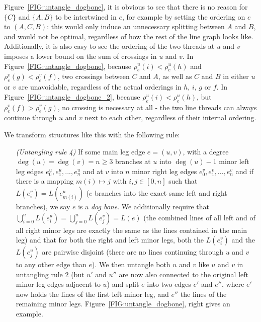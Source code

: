 \documentclass[format=acmsmall, review=false, screen=true]{acmart}
\begin{document}
Figure~\ref{FIG:untangle_dogbone}, it is obvious to see that there is no reason for $\{C\}$ and $\{A, B\}$ to be intertwined in $e$, for example by setting the ordering on $e$ to $(A, C, B)$: this would only induce an unnecessary splitting between $A$ and $B$, and would not be optimal, regardless of how the rest of the line graph looks like. Additionally, it is also easy to see the ordering of the two threads at $u$ and $v$ imposes a lower bound on the sum of crossings in $u$ and $v$. In Figure~\ref{FIG:untangle_dogbone}, because $\rho^u_e(i) < \rho^u_e(h)$ and $\rho^v_e(g) < \rho^v_e(f)$, two crossings between $C$ and $A$, as well as $C$ and $B$ in either $u$ or $v$ are unavoidable, regardless of the actual orderings in $h$, $i$, $g$ or $f$. In Figure~\ref{FIG:untangle_dogbone_2}, because $\rho^u_e(i) < \rho^u_e(h)$, but $\rho^v_e(f) > \rho^v_e(g)$, no crossing is necessary at all - the two line threads can always continue through $u$ and $v$ next to each other, regardless of their internal ordering. 

We transform structures like this with the following rule:

\begin{enumerate}[parsep=0.5mm, wide, labelwidth=0mm, itemindent=2.3mm]
  \setlength\itemsep{1pt}
  \item[\emph{(Untangling rule 4)}] If some main leg edge $e = (u, v)$, with a degree $\deg(u) = \deg(v) = n \geq 3$ branches at $u$ into $\deg(u) - 1$ minor left leg edges $e^u_{0}, e^u_{1}, ..., e^u_{n}$ and at $v$ into $n$ minor right leg edges $e^v_{0}, e^v_{1}, ..., e^v_{n}$ and if there is a mapping $m(i) \mapsto j$ with $i, j \in [0, n]$ such that $L(e^v_i) = L(e^u_{m(i)})$ ($e$ branches into the exact same left and right branches), we say $e$ is a \emph{dog bone}. We additionally require that $\bigcup^{n}_{i = 0} L(e^u_{i}) = \bigcup^{n}_{j = 0} L(e^v_{j}) = L(e)$ (the combined lines of all left and of all right minor legs are exactly the same as the lines contained in the main leg) and that for both the right and left minor legs, both the $L(e^v_i)$ and the $L(e^u_j)$ are pairwise disjoint (there are no lines continuing through $u$ and $v$ to any other edge than $e$). We then untangle both $u$ and $v$ like $u$ and $v$ in untangling rule 2 (but $u'$ and $u''$ are now also connected to the original left minor leg edges adjacent to $u$) and split $e$ into two edges $e'$ and $e''$, where $e'$ now holds the lines of the first left minor leg, and $e''$ the lines of the remaining minor legs. Figure~\ref{FIG:untangle_dogbone}, right gives an example.
\end{enumerate}
\end{document}

